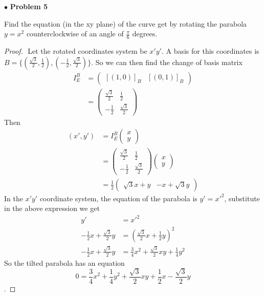 \documentclass{article}
\begin{document}
\newpage
$ \bullet$ \textbf{Problem 5}
\medskip

\begin{itshape}
Find the equation (in the xy plane) of the curve get by rotating the parabola $y=x^2$ counterclockwise of an angle of $\frac{\pi}{6}$ degrees.
\end{itshape}
\medskip

\begin{proof}
$ $\newline
Let the rotated coordinates system be $x'y'$. A basis for this coordinates is $B=\{ (\frac{\sqrt{3}}{2}, \frac{1}{2}), (-\frac{1}{2}, \frac{\sqrt{3}}{2}) \}$. So we can then find the change of basis matrix
\begin{align*}
I_{E}^{B} &= \begin{pmatrix} [(1,0)]_B & [(0,1)]_B \end{pmatrix} \\
&= \begin{pmatrix} \frac{\sqrt{3}}{2} & \frac{1}{2} \\ -\frac{1}{2} & \frac{\sqrt{3}}{2} \end{pmatrix}
\end{align*}
Then
\begin{align*}
(x',y') &= I_E^B \begin{pmatrix} x \\ y \end{pmatrix} \\
&= \begin{pmatrix} \frac{\sqrt{3}}{2} & \frac{1}{2} \\ -\frac{1}{2} & \frac{\sqrt{3}}{2} \end{pmatrix}  \begin{pmatrix} x \\ y \end{pmatrix} \\
&= \frac{1}{2} \begin{pmatrix} \sqrt{3} x + y & -x + \sqrt{3}y \end{pmatrix}
\end{align*}
In the $x'y'$ coordinate system, the equation of the parabola is $y'=x'^2$, substitute in the above expression we get
\begin{align*}
y' &= x'^2 \\
-\frac{1}{2}x+\frac{\sqrt{3}}{2}y &= (\frac{\sqrt{3}}{2}x+\frac{1}{2}y)^2 \\
-\frac{1}{2}x+\frac{\sqrt{3}}{2}y &= \frac{3}{4}x^2 + \frac{\sqrt{3}}{2}xy +\frac{1}{4}y^2
\end{align*}
So the tilted parabola has an equation $$0=\frac{3}{4}x^2 +\frac{1}{4}y^2 +\frac{\sqrt{3}}{2}xy +\frac{1}{2}x - \frac{\sqrt{3}}{2}y$$.
\end{proof}
\end{document}

